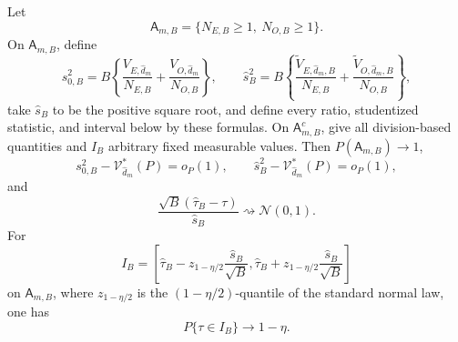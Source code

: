 Let
\[
 \mathsf A_{m,B}=\{N_{E,B}\ge1,\ N_{O,B}\ge1\}.
\]
On \(\mathsf A_{m,B}\), define
\[
 s_{0,B}^2=B\left\{
 \frac{V_{E,\widehat d_m}}{N_{E,B}}+
 \frac{V_{O,\widehat d_m}}{N_{O,B}}\right\},
 \qquad
 \widehat s_B^2=B\left\{
 \frac{\widetilde V_{E,\widehat d_m,B}}{N_{E,B}}+
 \frac{\widetilde V_{O,\widehat d_m,B}}{N_{O,B}}\right\},
\]
take \(\widehat s_B\) to be the positive square root, and define every ratio, studentized statistic, and interval below by these formulas.  On \(\mathsf A_{m,B}^{c}\), give all division-based quantities and \(I_B\) arbitrary fixed measurable values.  Then \(P(\mathsf A_{m,B})\to1\),
\[
 s_{0,B}^2-\mathcal V_{\widehat d_m}^*(P)=o_P(1),
 \qquad
 \widehat s_B^2-\mathcal V_{\widehat d_m}^*(P)=o_P(1),
\]
and
\[
 \frac{\sqrt B(\widehat\tau_B-\tau)}{\widehat s_B}
 \rightsquigarrow\mathcal N(0,1).
\]
For
\[
 I_B=\left[
 \widehat\tau_B-z_{1-\eta/2}\frac{\widehat s_B}{\sqrt B},
 \widehat\tau_B+z_{1-\eta/2}\frac{\widehat s_B}{\sqrt B}
 \right]
\]
on \(\mathsf A_{m,B}\), where \(z_{1-\eta/2}\) is the \((1-\eta/2)\)-quantile of the standard normal law, one has
\[
 P\{\tau\in I_B\}\longrightarrow1-\eta.
\]